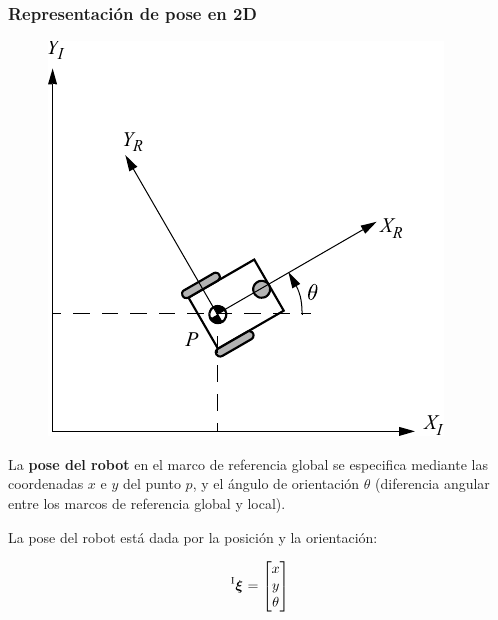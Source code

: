 \begin{frame}
    \frametitle{Representación de pose en 2D}

    \begin{figure}
        \includegraphics[width=0.2\columnwidth]{./images/coordinate_systems.pdf}
    \end{figure}
    
    La {\bf pose del robot} en el marco de referencia global se especifica mediante las coordenadas $x$ e $y$ del punto $p$, y el ángulo de orientación $\theta$ (diferencia angular entre los marcos de referencia global y local).

    La pose del robot está dada por la posición y la orientación:

    \begin{equation*}
        \prescript{\mathrm{I}}{}{{\boldsymbol{\mathbf{\xi}}}_\mathrm{}} =
        \begin{bmatrix}
            x\\
            y\\
            \theta
        \end{bmatrix}
    \end{equation*}
\end{frame}


